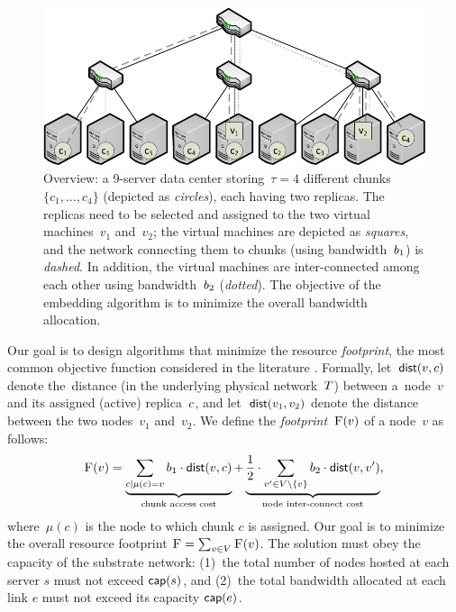 \begin{figure}[t]
\centering
\includegraphics[width=0.79\columnwidth]{figs/static-mapping/data_locality_no_legend.pdf}
\caption{Overview: a 9-server data center storing~$\tau=4$ different chunks~$\{c_1,\ldots,c_4\}$ (depicted as \emph{circles}), each having two replicas. The replicas need to be selected and assigned to the two
 virtual machines~$v_1$ and~$v_2$; the virtual machines are depicted as \emph{squares}, and
 the network connecting them to chunks (using bandwidth~$b_1$) is \emph{dashed}. In addition, the virtual machines are inter-connected among
 each other using bandwidth~$b_2$ (\emph{dotted}). The objective of the embedding algorithm is to minimize the overall bandwidth allocation.}\label{fig:overview}
\end{figure}


Our goal is to design algorithms that minimize the resource \emph{footprint}, the most common objective function considered in the literature \cite{fischer-survey}.
Formally, let~$\mathrm{\textsf{dist}}(v,c)$ denote the~distance (in the underlying physical network~$T$) between a~node~$v$ and
its assigned (active) replica~$c$, and let~$\mathrm{\textsf{dist}}(v_1,v_2)$ denote the distance between the two nodes~$v_1$ and~$v_2$.
We define the \emph{footprint}~$\textsc{F}(v)$ of a node~$v$ as follows:
$$
\textsc{F}(v) = \underbrace{\sum_{c \mid \mu(c) = v} b_1 \cdot \mathrm{\textsf{dist}}(v,c)}_{\text{chunk access cost}} +  \underbrace{\frac{1}{2} \cdot \sum_{v' \in V\setminus\{v\}} b_2 \cdot \mathrm{\textsf{dist}}(v,v')}_{\text{node inter-connect cost}},
$$
where~$\mu(c)$ is the node to which chunk $c$ is assigned.
Our goal is to minimize the overall resource footprint $\textsc{F}=\sum_{v\in V} \textsc{F}(v)$.
The solution must obey the capacity of the substrate network: (1)~the total number of nodes hosted at each server $s$ must not exceed $\textsf{cap}(s)$, and (2)~the total bandwidth allocated at each link $e$ must not exceed its capacity $\textsf{cap}(e)$.


